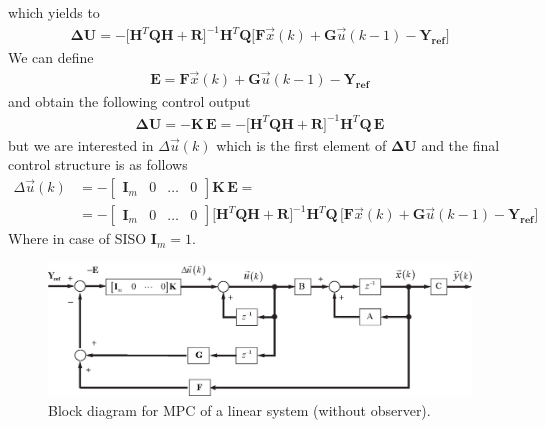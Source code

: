 \documentclass[11pt,a4paper,oneside]{book}
\numberwithin{equation}{section}
\theoremstyle{it}
\theoremstyle{definition}
\begin{document}
which yields to 
\begin{equation}\label{eq23}
	\begin{aligned}
		\mathbf{\Delta U} = - \Big[\mathbf{H}^T\mathbf{Q}\mathbf{H} + 
		\mathbf{R}\Big]^{-1} \mathbf{H}^T\mathbf{Q}\Big[\mathbf{F}\vec{x}(k)+ 
		\mathbf{G}\vec{u}(k-1) - \mathbf{Y_{ref}}\Big]
	\end{aligned}
\end{equation}
We can define 
\begin{equation}\label{eq24}
	\begin{aligned}
		\mathbf{E} = \mathbf{F}\vec{x}(k)+ \mathbf{G}\vec{u}(k-1) - 
		\mathbf{Y_{ref}}
	\end{aligned}
\end{equation}
and obtain the following control output
\begin{equation}\label{eq25}
	\begin{aligned}
		\mathbf{\Delta U} = -\mathbf{K}\,\mathbf{E} = - 
		\Big[\mathbf{H}^T\mathbf{Q}\mathbf{H} + \mathbf{R}\Big]^{-1} 
		\mathbf{H}^T\mathbf{Q}\,\mathbf{E}
	\end{aligned}
\end{equation}
but we are interested in $\Delta\vec{u}(k)$ which is the first element of 
$\mathbf{\Delta U}$ and the final control structure is as follows 
\begin{equation}\label{eq25}
	\begin{aligned}
		\Delta\vec{u}(k) &= -\begin{bmatrix}
			\mathbf{I}_m & 0 & \dots & 0
		\end{bmatrix}\mathbf{K}\,\mathbf{E} = \\[6pt]
		&= - \begin{bmatrix}
			\mathbf{I}_m & 0 & \dots & 0
		\end{bmatrix} \Big[\mathbf{H}^T\mathbf{Q}\mathbf{H} + 
		\mathbf{R}\Big]^{-1} \mathbf{H}^T\mathbf{Q}\,\Big[\mathbf{F}\vec{x}(k)+ 
		\mathbf{G}\vec{u}(k-1) - \mathbf{Y_{ref}}\Big]
	\end{aligned}
\end{equation}
Where in case of SISO $\mathbf{I}_m = 1$.
\begin{figure}[H]
	\centering
	\includegraphics[width = 440pt, 
	keepaspectratio]{figures/mpc/predictive_1.eps}
	\captionsetup{width=.5\textwidth}
	\caption{Block diagram for MPC of a linear system (without observer).}
	\label{fig:mpc_block}
\end{figure}
\end{document}

